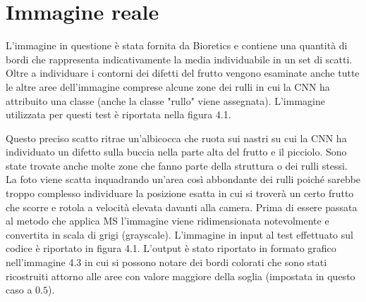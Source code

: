 \documentclass[12pt,a4paper]{report}
\begin{document}
{\section{Immagine reale}
L'immagine in questione è stata fornita da Bioretics e contiene una quantità di bordi che rappresenta indicativamente la media individuabile in un set di scatti. Oltre a individuare i contorni dei difetti del frutto vengono esaminate anche tutte le altre aree dell'immagine comprese alcune zone dei rulli in cui la CNN ha attribuito una classe (anche la classe "rullo" viene assegnata).
L'immagine utilizzata per questi test è riportata nella figura 4.1.
\begin{figure}[H]
\centering
\begin{floatrow}[1]
\end{floatrow}
\end{figure}
\newpage
Questo preciso scatto ritrae un'albicocca che ruota sui nastri su cui la CNN ha individuato un difetto sulla buccia nella parte alta del frutto e il picciolo. Sono state trovate anche molte zone che fanno parte della struttura o dei rulli stessi. La foto viene scatta inquadrando un'area così abbondante dei rulli poiché sarebbe troppo complesso individuare la posizione esatta in cui si troverà un certo frutto che scorre e rotola a velocità elevata davanti alla camera. \newline
Prima di essere passata al metodo che applica MS l'immagine viene ridimensionata notevolmente e convertita in scala di grigi (grayscale). L'immagine in input al test effettuato sul codice è riportato in figura 4.1.
L'output è stato riportato in formato grafico nell'immagine 4.3 in cui si possono notare dei bordi colorati che sono stati ricostruiti attorno alle aree con valore maggiore della soglia (impostata in questo caso a $0.5$).
\begin{figure}[H]
\centering
\begin{floatrow}[1]
\end{floatrow}
\end{figure} 

}
\end{document}
